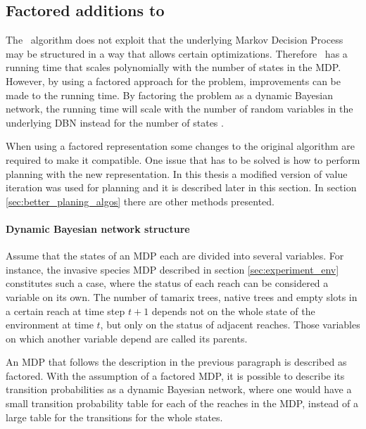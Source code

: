 \subsection{Factored additions to \etre}
\label{sec:factored_e3}

The \etre\ algorithm does not exploit that the underlying Markov Decision
Process may be structured in a way that allows certain optimizations. Therefore
\etre\ has a running time that scales polynomially with the number of states in
the MDP. However, by using a factored approach for the problem, improvements
can be made to the running time. By factoring the problem as a dynamic Bayesian
network, the running time will scale with the number of random variables in the
underlying DBN instead for the number of states
\parencite{kearns1999efficient}. 

When using a factored representation some changes to the original algorithm are
required to make it compatible. One issue that has to be solved is how to
perform  planning with the new representation. In this thesis a modified version
of value iteration was used for planning and it is described later in this
section. In section \ref{sec:better_planing_algos} there are other methods
presented.


\paragraph{Dynamic Bayesian network structure}

Assume that the states of an MDP each are divided into several variables. For
instance, the invasive species MDP described in section
\ref{sec:experiment_env} constitutes such a case, where the status of each
reach can be considered a variable on its own. The number of tamarix trees,
native trees and empty slots in a certain reach at time step $t+1$ depends not
on the whole state of the environment at time $t$, but only on the status of
adjacent reaches. Those variables on which another variable depend are called
its parents.  

An MDP that follows the description in the previous paragraph is described as
factored. With the assumption of a factored MDP, it is possible to describe its
transition probabilities as a dynamic Bayesian network, where one would have a
small transition probability table for each of the reaches in the MDP, instead
of a large table for the transitions for the whole states.
